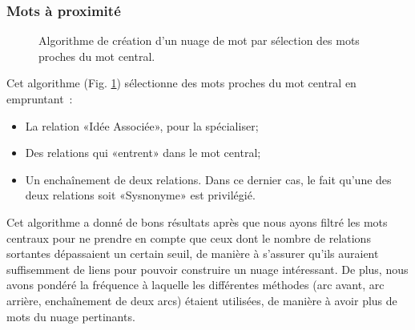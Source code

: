 \documentclass[a4paper,11pt,french]{article}
\begin{document}
\subsubsection{Mots à proximité}
\begin{figure}[ht]
  \begin{center}
    \caption{Algorithme de création d'un nuage de mot par sélection des mots proches du mot central.}
    \label{fig:algo-proximite}
  \end{center}
\end{figure}

Cet algorithme (Fig. \ref{fig:algo-proximite}) sélectionne des mots proches du mot central en empruntant~:
\begin{itemize}
\item La relation «Idée Associée», pour la spécialiser;
\item Des relations qui «entrent» dans le mot central;
\item Un enchaînement de deux relations. Dans ce dernier cas, le fait qu'une des deux relations soit «Sysnonyme» est privilégié.
\end{itemize}

Cet algorithme a donné de bons résultats après que nous ayons filtré les mots centraux pour ne prendre en compte que ceux dont le nombre de
relations sortantes dépassaient un certain seuil, de manière à s'assurer qu'ils auraient suffisemment de liens pour pouvoir construire un
nuage intéressant. De plus, nous avons pondéré la fréquence à laquelle les différentes méthodes (arc avant, arc arrière, enchaînement de
deux arcs) étaient utilisées, de manière à avoir plus de mots du nuage pertinants.
\end{document}
